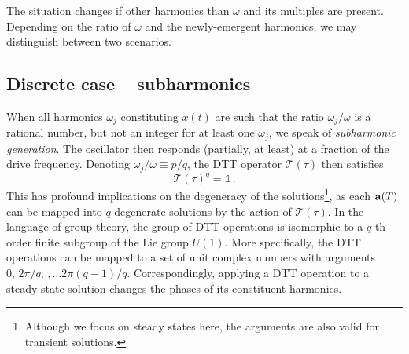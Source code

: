 The situation changes if other harmonics than $\omega$ and its multiples are present. Depending on the ratio of $\omega$ and the newly-emergent harmonics, we may distinguish between two scenarios. 

\subsection{Discrete case -- subharmonics} \label{sec:hopf_discrete}
When all harmonics $\omega_j$ constituting $x(t)$ are such that the ratio $\omega_j / \omega$ is a rational number, but not an integer for at least one $\omega_j$, we speak of \textit{subharmonic generation}. The oscillator then responds (partially, at least) at a fraction of the drive frequency. Denoting $\omega_j / \omega \equiv p / q$, the DTT operator $\mathcal{T}(\tau)$ then satisfies
\begin{equation} \label{eq:hopf_DTT}
\mathcal{T}(\tau)^q = \mathbb{1} \, .
\end{equation}
This has profound implications on the degeneracy of the solutions\footnote{Although we focus on steady states here, the arguments are also valid for transient solutions.}, as each $\vb{a}(T)$ can be mapped into $q$ degenerate solutions by the action of $\mathcal{T}(\tau)$. In the language of group theory, the group of DTT operations is isomorphic to a $q$-th order finite subgroup of the Lie group $U(1)$. More specifically, the DTT operations can be mapped to a set of unit complex numbers with arguments $0, \, 2\pi/q,\,, \ldots 2\pi(q-1)/q$. Correspondingly, applying a DTT operation to a steady-state solution changes the phases of its constituent harmonics.

